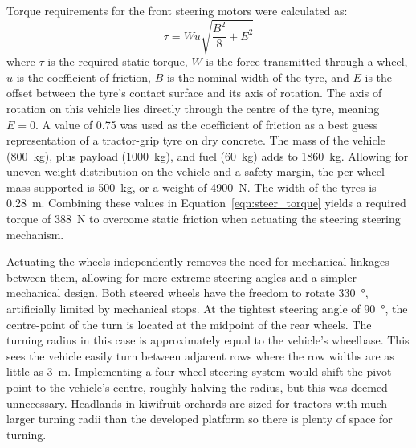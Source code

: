 \documentclass[preprint,authoryear,12pt]{elsarticle}
\begin{document}
        Torque requirements for the front steering motors were calculated as:
        \begin{equation}
        \label{eqn:steer_torque}
        \tau = W u \sqrt{\frac{B^2}{8} + E^2}
        \end{equation}
        where $\tau$ is the required static torque, $W$ is the force transmitted through a wheel, $u$ is the coefficient of friction, $B$ is the nominal width of the tyre, and $E$ is the offset between the tyre's contact surface and its axis of rotation.
        The axis of rotation on this vehicle lies directly through the centre of the tyre, meaning $E=0$.
        A value of 0.75 was used as the coefficient of friction as a best guess representation of a tractor-grip tyre on dry concrete.
        The mass of the vehicle (\SI{800}{\kilo\gram}), plus payload (\SI{1000}{\kilo\gram}), and fuel (\SI{60}{\kilo\gram}) adds to \SI{1860}{\kilo\gram}.
        Allowing for uneven weight distribution on the vehicle and a safety margin, the per wheel mass supported is \SI{500}{\kilo\gram}, or a weight of \SI{4900}{\newton}.
        The width of the tyres is \SI{0.28}{\meter}.
        Combining these values in Equation~\ref{eqn:steer_torque} yields a required torque of \SI{388}{\newton} to overcome static friction when actuating the steering steering mechanism.

        Actuating the wheels independently removes the need for mechanical linkages between them, allowing for more extreme steering angles and a simpler mechanical design.
        Both steered wheels have the freedom to rotate \SI{330}{\degree}, artificially limited by mechanical stops.
        At the tightest steering angle of \SI{90}{\degree}, the centre-point of the turn is located at the midpoint of the rear wheels.
        The turning radius in this case is approximately equal to the vehicle's wheelbase.
        This sees the vehicle easily turn between adjacent rows where the row widths are as little as \SI{3}{\meter}.
        Implementing a four-wheel steering system would shift the pivot point to the vehicle's centre, roughly halving the radius, but this was deemed unnecessary.
        Headlands in kiwifruit orchards are sized for tractors with much larger turning radii than the developed platform so there is plenty of space for turning.
\end{document}
